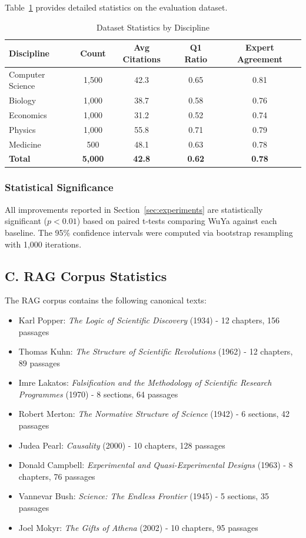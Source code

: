 \documentclass[11pt,a4paper]{article}
\newcommand{\rag}{RAG}
\begin{document}
Table~\ref{tab:dataset-stats} provides detailed statistics on the evaluation dataset.

\begin{table}[ht]
\centering
\caption{Dataset Statistics by Discipline}
\label{tab:dataset-stats}
\begin{tabular}{@{}lcccc@{}}
\toprule
\textbf{Discipline} & \textbf{Count} & \textbf{Avg Citations} & \textbf{Q1 Ratio} & \textbf{Expert Agreement} \\
\midrule
Computer Science & 1,500 & 42.3 & 0.65 & 0.81 \\
Biology & 1,000 & 38.7 & 0.58 & 0.76 \\
Economics & 1,000 & 31.2 & 0.52 & 0.74 \\
Physics & 1,000 & 55.8 & 0.71 & 0.79 \\
Medicine & 500 & 48.1 & 0.63 & 0.78 \\
\midrule
\textbf{Total} & \textbf{5,000} & \textbf{42.8} & \textbf{0.62} & \textbf{0.78} \\
\bottomrule
\end{tabular}
\end{table}

\subsubsection{Statistical Significance}

All improvements reported in Section~\ref{sec:experiments} are statistically significant ($p < 0.01$) based on paired t-tests comparing WuYa against each baseline. The 95\% confidence intervals were computed via bootstrap resampling with 1,000 iterations.

\subsection{C. RAG Corpus Statistics}

The \rag{} corpus contains the following canonical texts:

\begin{itemize}
    \item Karl Popper: \textit{The Logic of Scientific Discovery} (1934) - 12 chapters, 156 passages
    \item Thomas Kuhn: \textit{The Structure of Scientific Revolutions} (1962) - 12 chapters, 89 passages
    \item Imre Lakatos: \textit{Falsification and the Methodology of Scientific Research Programmes} (1970) - 8 sections, 64 passages
    \item Robert Merton: \textit{The Normative Structure of Science} (1942) - 6 sections, 42 passages
    \item Judea Pearl: \textit{Causality} (2000) - 10 chapters, 128 passages
    \item Donald Campbell: \textit{Experimental and Quasi-Experimental Designs} (1963) - 8 chapters, 76 passages
    \item Vannevar Bush: \textit{Science: The Endless Frontier} (1945) - 5 sections, 35 passages
    \item Joel Mokyr: \textit{The Gifts of Athena} (2002) - 10 chapters, 95 passages
\end{itemize}
\end{document}
